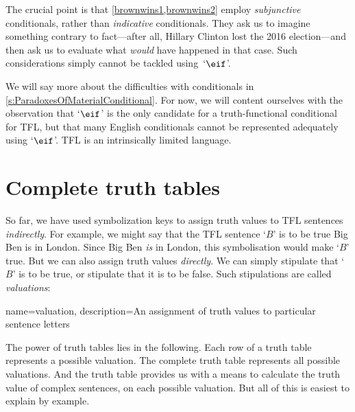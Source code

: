 The crucial point is that \cref*{brownwins1,brownwins2} employ \emph{subjunctive} conditionals, rather than \emph{indicative} conditionals. They ask us to imagine something contrary to fact---after all, Hillary Clinton lost the 2016 election---and then ask us to evaluate what \emph{would} have happened in that case. Such considerations simply cannot be tackled using~`$\eif$'.

We will say more about the difficulties with conditionals in \cref{s:ParadoxesOfMaterialConditional}. For now, we will content ourselves with the observation that `$\eif$' is the only candidate for a truth-functional conditional for TFL, but that many English conditionals cannot be represented adequately using `$\eif$'. TFL is an intrinsically limited language.


\chapter{Complete truth tables}
\label{s:CompleteTruthTables}

So far, we have used symbolization keys to assign truth values to TFL sentences \emph{indirectly}. For example, we might say that the TFL sentence `$B$' is to be true \ifeff{} Big Ben is in London. Since Big Ben \emph{is} in London, this symbolisation would make `$B$' true. But we can also assign truth values \emph{directly}. We can simply stipulate that `$B$' is to be true, or stipulate that it is to be false. Such stipulations are called \emph{valuations}: 

{
name=valuation,
description={An assignment of \glspl{truth value} to particular \glspl{sentence letter}}
}

The power of truth tables lies in the following. Each row of a truth table represents a possible valuation. The complete truth table represents all possible valuations. And the truth table provides us with a means to calculate the truth value of complex sentences, on each possible valuation. But all of this is easiest to explain by example.

